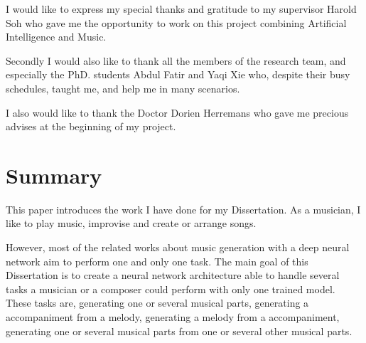 \documentclass[12pt]{report}
\begin{document}
I would like to express my special thanks and gratitude to my supervisor Harold Soh who gave me the opportunity to work on this project combining Artificial Intelligence and Music.

Secondly I would also like to thank all the members of the research team, and especially the PhD. students Abdul Fatir and Yaqi Xie who, despite their busy schedules, taught me, and help me in many scenarios.

I also would like to thank the Doctor Dorien Herremans who gave me precious advises at the beginning of my project.

\newpage
\tableofcontents
\newpage


\setlength{\parindent}{0.6cm}


\chapter*{Summary}

This paper introduces the work I have done for my Dissertation.
As a musician, I like to play music, improvise and create or arrange songs.

However, most of the related works about music generation with a deep neural network aim to perform one and only one task.
The main goal of this Dissertation is to create a neural network architecture able to handle several tasks a musician or a composer could perform with only one trained model.
These tasks are, generating one or several musical parts, generating a accompaniment from a melody, generating a melody from a accompaniment, generating one or several musical parts from one or several other musical parts.
\end{document}
